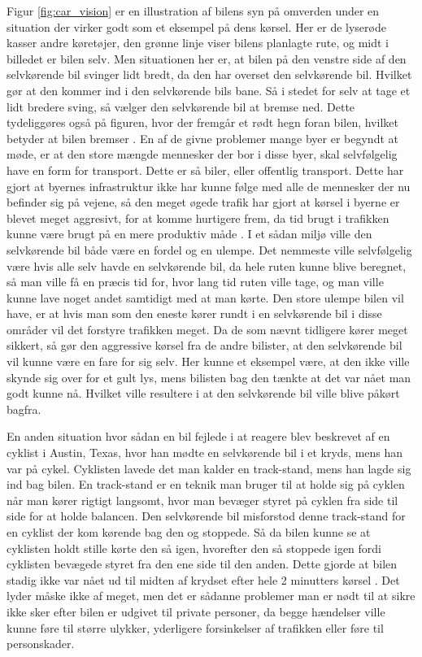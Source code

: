 Figur \ref{fig:car_vision} er en illustration af bilens syn på omverden under en situation der virker godt som et eksempel på dens kørsel. Her er de lyserøde kasser andre køretøjer, den grønne linje viser bilens planlagte rute, og midt i billedet er bilen selv. Men situationen her er, at bilen på den venstre side af den selvkørende bil svinger lidt bredt, da den har overset den selvkørende bil. Hvilket gør at den kommer ind i den selvkørende bils bane. Så i stedet for selv at tage et lidt bredere sving, så vælger den selvkørende bil at bremse ned. Dette tydeliggøres også på figuren, hvor der fremgår et rødt hegn foran bilen, hvilket betyder at bilen bremser \cite{Backchannel}. En af de givne problemer mange byer er begyndt at møde, er at den store mængde mennesker der bor i disse byer, skal selvfølgelig have en form for transport. Dette er så biler, eller offentlig transport. Dette har gjort at byernes infrastruktur ikke har kunne følge med alle de mennesker der nu befinder sig på vejene, så den meget øgede trafik har gjort at kørsel i byerne er blevet meget aggresivt, for at komme hurtigere frem, da tid brugt i trafikken kunne være brugt på en mere produktiv måde \cite{Michelin}. I et sådan miljø ville den selvkørende bil både være en fordel og en ulempe. Det nemmeste ville selvfølgelig være hvis alle selv havde en selvkørende bil, da hele ruten kunne blive beregnet, så man ville få en præcis tid for, hvor lang tid ruten ville tage, og man ville kunne lave noget andet samtidigt med at man kørte. Den store ulempe bilen vil have, er at hvis man som den eneste kører rundt i en selvkørende bil i disse områder vil det forstyre trafikken meget. Da de som nævnt tidligere kører meget sikkert, så gør den aggressive kørsel fra de andre bilister, at den selvkørende bil vil kunne være en fare for sig selv. Her kunne et eksempel være, at den ikke ville skynde sig over for et gult lys, mens bilisten bag den tænkte at det var nået man godt kunne nå. Hvilket ville resultere i at den selvkørende bil ville blive påkørt bagfra.

En anden situation hvor sådan en bil fejlede i at reagere blev beskrevet af en cyklist i Austin, Texas, hvor han mødte en selvkørende bil i et kryds, mens han var på cykel. Cyklisten lavede det man kalder en track-stand, mens han lagde sig ind bag bilen. En track-stand er en teknik man bruger til at holde sig på cyklen når man kører rigtigt langsomt, hvor man bevæger styret på cyklen fra side til side for at holde balancen. Den selvkørende bil misforstod denne track-stand for en cyklist der kom kørende bag den og stoppede. Så da bilen kunne se at cyklisten holdt stille kørte den så igen, hvorefter den så stoppede igen fordi cyklisten bevægede styret fra den ene side til den anden. Dette gjorde at bilen stadig ikke var nået ud til midten af krydset efter hele 2 minutters kørsel \cite{VOX}. Det lyder måske ikke af meget, men det er sådanne problemer man er nødt til at sikre ikke sker efter bilen er udgivet til private personer, da begge hændelser ville kunne føre til større ulykker, yderligere forsinkelser af trafikken eller føre til personskader. 